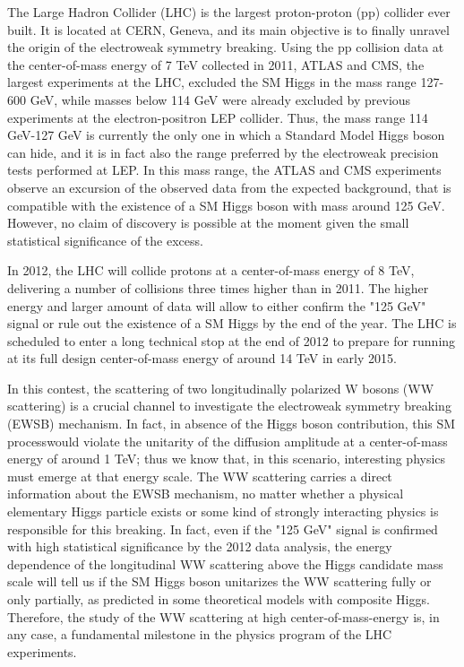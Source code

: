 \documentclass[10pt, a4paper]{article}
\begin{document}
The Large Hadron Collider (LHC) is the largest proton-proton (pp) collider ever built. 
It is located at CERN, Geneva, and its main objective is to finally unravel the origin of the electroweak symmetry breaking. Using the pp collision data at the center-of-mass energy of 7 TeV collected in 2011, ATLAS and CMS, the 
largest experiments at the LHC, excluded the SM Higgs in the mass range 127-600 GeV, while masses below 114 GeV were already excluded by previous experiments at the electron-positron LEP collider. Thus, the mass range 114 GeV-127 GeV is currently the only one in which a Standard Model Higgs boson can hide, and it is in fact also the range preferred by the electroweak precision tests performed at LEP. In this mass range, the ATLAS and CMS experiments observe an excursion of the observed data from the expected background, that is compatible with the existence of a SM Higgs boson with mass around 125 GeV. However, no claim of discovery is possible at the moment given the small statistical significance of the excess. 

In 2012, the LHC will collide protons at a center-of-mass energy of 8 TeV, delivering a number of collisions three times higher than in 2011. The higher energy and larger amount of data will allow to either confirm the "125 GeV" signal or rule out the existence of a SM Higgs by the end of the year. The LHC is scheduled to enter a long technical stop at the end of 2012 to prepare for running at its full design center-of-mass energy of around 14 TeV in early 2015.

In this contest, the scattering of two longitudinally polarized W bosons (WW scattering) is a crucial channel to 
investigate the electroweak symmetry breaking (EWSB) mechanism. In fact, in absence of the Higgs boson contribution, this SM processwould violate the unitarity of the diffusion amplitude at a center-of-mass energy of around 1 TeV; thus we know that, in this scenario, interesting physics must emerge at that energy scale. The WW scattering carries a direct information about the EWSB mechanism, no matter whether a physical elementary Higgs particle exists or some kind of strongly interacting physics is responsible for this breaking. In fact, even if the "125 GeV" signal is confirmed with high statistical significance by the 2012 data analysis, the energy dependence of the longitudinal WW scattering above the Higgs candidate mass scale will tell us if the SM Higgs boson unitarizes the WW scattering fully or only partially, as predicted in some theoretical models with composite Higgs. Therefore, the study of the WW scattering at high center-of-mass-energy is, in any case, a fundamental milestone in the physics program of the LHC experiments.
\end{document}
